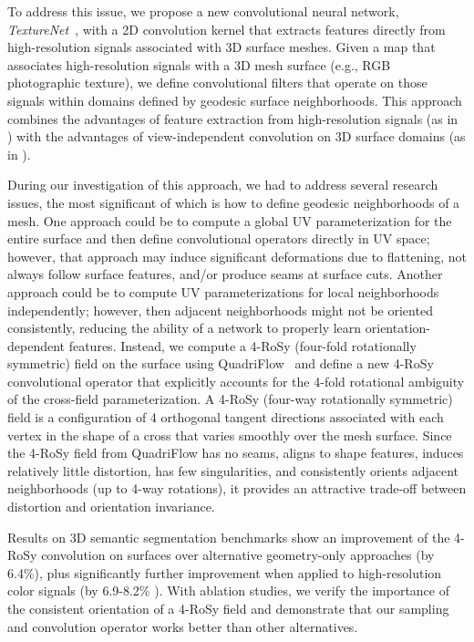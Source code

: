 To address this issue, we propose a new convolutional neural network, \emph{TextureNet}~\cite{huang2018texturenet}, with a 2D convolution kernel that extracts features directly from high-resolution signals associated with 3D surface meshes.  Given a map that associates high-resolution signals with a 3D mesh surface (e.g., RGB photographic texture), we define convolutional filters that operate on those signals within domains defined by geodesic surface neighborhoods.   This approach combines the advantages of feature extraction from high-resolution signals (as in \cite{dai20183dmv}) with the advantages of view-independent convolution on 3D surface domains (as in \cite{tatarchenko2018tangent}).

During our investigation of this approach, we had to address several research issues, the most significant of which is how to define geodesic neighborhoods of a mesh.   One approach could be to compute a global UV parameterization for the entire surface and then define convolutional operators directly in UV space; however, that approach may induce significant deformations due to flattening, not always follow surface features, and/or produce seams at surface cuts.  Another approach could be to compute UV parameterizations for local neighborhoods independently; however, then adjacent neighborhoods might not be oriented consistently, reducing the ability of a network to properly learn orientation-dependent features.   Instead, we compute a 4-RoSy (four-fold rotationally symmetric) field on the surface using QuadriFlow~\cite{huang2018quadriflow} and define a new 4-RoSy convolutional operator that explicitly accounts for the 4-fold rotational ambiguity of the cross-field parameterization. A 4-RoSy (four-way rotationally symmetric) field is a configuration of 4 orthogonal tangent directions associated with each vertex in the shape of a cross that varies smoothly over the mesh surface.  Since the 4-RoSy field from QuadriFlow has no seams, aligns to shape features, induces relatively little distortion, has few singularities, and consistently orients adjacent neighborhoods (up to 4-way rotations), it provides an attractive trade-off between distortion and orientation invariance.

Results on 3D semantic segmentation benchmarks show an improvement of the 4-RoSy convolution on surfaces over alternative geometry-only approaches (by 6.4\%), plus significantly further improvement when applied to high-resolution color signals (by 6.9-8.2\% ).  With ablation studies, we verify the importance of the consistent orientation of a 4-RoSy field and demonstrate that our sampling and convolution operator works better than other alternatives.

